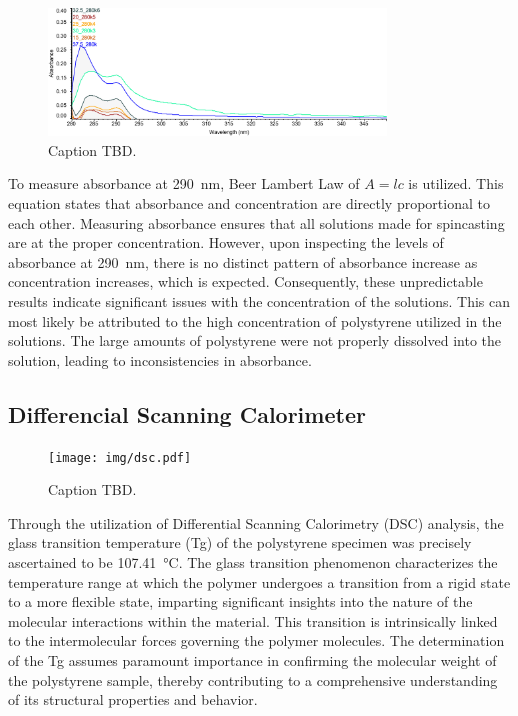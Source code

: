 \documentclass[twocolumn]{article}
\begin{document}
                \begin{figure}
                    \centering
                    \includegraphics[width=0.8\textwidth]{img/uvvis.png}
                    \caption{Caption TBD.}\label{fig:uv-vis}
                \end{figure}
                To measure absorbance at \qty{290}{\nano\meter}, Beer Lambert Law of $A = lc$ is utilized. This equation states that absorbance and concentration are directly proportional to each other. Measuring absorbance ensures that all solutions made for spincasting are at the proper concentration. However, upon inspecting the levels of absorbance at \qty{290}{\nano\meter}, there is no distinct pattern of absorbance increase as concentration increases, which is expected. Consequently, these unpredictable results indicate significant issues with the concentration of the solutions. This can most likely be attributed to the high concentration of polystyrene utilized in the solutions. The large amounts of  polystyrene were not properly dissolved into the solution, leading to inconsistencies in absorbance. 

            \subsection{Differencial Scanning Calorimeter}
                \begin{figure}[H]
                    \centering
                    \texttt{[image: img/dsc.pdf]}
                    \caption{Caption TBD.}\label{fig:dsc}
                \end{figure}
                Through the utilization of Differential Scanning Calorimetry (DSC) analysis, the glass transition temperature (Tg) of the polystyrene specimen was precisely ascertained to be \qty{107.41}{\degreeCelsius}. The glass transition phenomenon characterizes the temperature range at which the polymer undergoes a transition from a rigid state to a more flexible state, imparting significant insights into the nature of the molecular interactions within the material. This transition is intrinsically linked to the intermolecular forces governing the polymer molecules\autocite{WOS:COUCHMAN}. The determination of the Tg assumes paramount importance in confirming the molecular weight of the polystyrene sample, thereby contributing to a comprehensive understanding of its structural properties and behavior.
\end{document}
